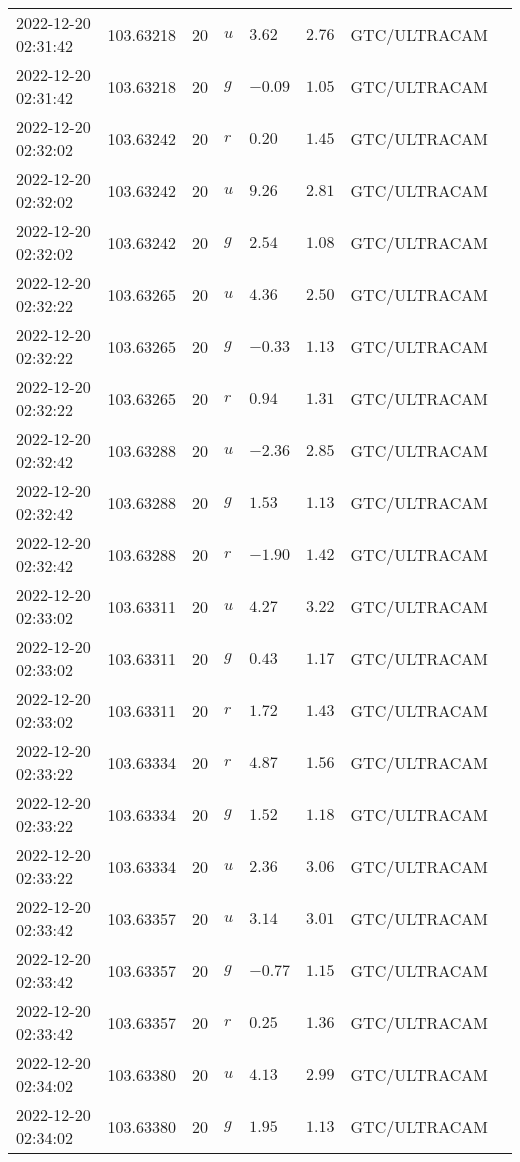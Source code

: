 \documentclass{nature_plusfigure}
\begin{document}
\begin{supplement}
\begin{center}
\begin{longtable}{llllllll}
2022-12-20 02:31:42 & 103.63218 & 20 & $u$ & $3.62$ & $2.76$ & GTC/ULTRACAM &  \\ 
2022-12-20 02:31:42 & 103.63218 & 20 & $g$ & $-0.09$ & $1.05$ & GTC/ULTRACAM &  \\ 
2022-12-20 02:32:02 & 103.63242 & 20 & $r$ & $0.20$ & $1.45$ & GTC/ULTRACAM &  \\ 
2022-12-20 02:32:02 & 103.63242 & 20 & $u$ & $9.26$ & $2.81$ & GTC/ULTRACAM &  \\ 
2022-12-20 02:32:02 & 103.63242 & 20 & $g$ & $2.54$ & $1.08$ & GTC/ULTRACAM &  \\ 
2022-12-20 02:32:22 & 103.63265 & 20 & $u$ & $4.36$ & $2.50$ & GTC/ULTRACAM &  \\ 
2022-12-20 02:32:22 & 103.63265 & 20 & $g$ & $-0.33$ & $1.13$ & GTC/ULTRACAM &  \\ 
2022-12-20 02:32:22 & 103.63265 & 20 & $r$ & $0.94$ & $1.31$ & GTC/ULTRACAM &  \\ 
2022-12-20 02:32:42 & 103.63288 & 20 & $u$ & $-2.36$ & $2.85$ & GTC/ULTRACAM &  \\ 
2022-12-20 02:32:42 & 103.63288 & 20 & $g$ & $1.53$ & $1.13$ & GTC/ULTRACAM &  \\ 
2022-12-20 02:32:42 & 103.63288 & 20 & $r$ & $-1.90$ & $1.42$ & GTC/ULTRACAM &  \\ 
2022-12-20 02:33:02 & 103.63311 & 20 & $u$ & $4.27$ & $3.22$ & GTC/ULTRACAM &  \\ 
2022-12-20 02:33:02 & 103.63311 & 20 & $g$ & $0.43$ & $1.17$ & GTC/ULTRACAM &  \\ 
2022-12-20 02:33:02 & 103.63311 & 20 & $r$ & $1.72$ & $1.43$ & GTC/ULTRACAM &  \\ 
2022-12-20 02:33:22 & 103.63334 & 20 & $r$ & $4.87$ & $1.56$ & GTC/ULTRACAM &  \\ 
2022-12-20 02:33:22 & 103.63334 & 20 & $g$ & $1.52$ & $1.18$ & GTC/ULTRACAM &  \\ 
2022-12-20 02:33:22 & 103.63334 & 20 & $u$ & $2.36$ & $3.06$ & GTC/ULTRACAM &  \\ 
2022-12-20 02:33:42 & 103.63357 & 20 & $u$ & $3.14$ & $3.01$ & GTC/ULTRACAM &  \\ 
2022-12-20 02:33:42 & 103.63357 & 20 & $g$ & $-0.77$ & $1.15$ & GTC/ULTRACAM &  \\ 
2022-12-20 02:33:42 & 103.63357 & 20 & $r$ & $0.25$ & $1.36$ & GTC/ULTRACAM &  \\ 
2022-12-20 02:34:02 & 103.63380 & 20 & $u$ & $4.13$ & $2.99$ & GTC/ULTRACAM &  \\ 
2022-12-20 02:34:02 & 103.63380 & 20 & $g$ & $1.95$ & $1.13$ & GTC/ULTRACAM &  \\ 

\end{longtable}
\end{center}
\end{supplement}
\end{document}

